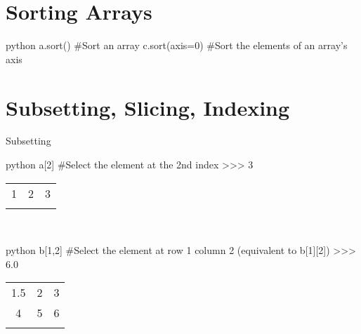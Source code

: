 \section{Sorting Arrays}

\begin{codebox}{python}{}
a.sort()  #Sort an array
c.sort(axis=0)  #Sort the elements of an array's axis
\end{codebox}


\section{Subsetting, Slicing, Indexing}

\begin{myblock}{Subsetting}
\begin{codebox}{python}{}
a[2]  #Select the element at the 2nd index
>>> 3
\end{codebox}
\begin{tabular}{ |c|c|c| } 
 \hhline{---}
 1 & 2 & \cellcolor[HTML]{FFFFFF}3\\
 \hhline{---}
\end{tabular}\\

\begin{codebox}{python}{}
b[1,2]  #Select the element at row 1 column 2 (equivalent to b[1][2])
>>> 6.0
\end{codebox}
\begin{tabular}{ |c|c|c| } 
 \hhline{---}
 1.5 & 2 & 3\\
 \hhline{---}
   4 & 5 & \cellcolor[HTML]{FFFFFF}6\\
 \hhline{---}
\end{tabular}
\end{myblock}

